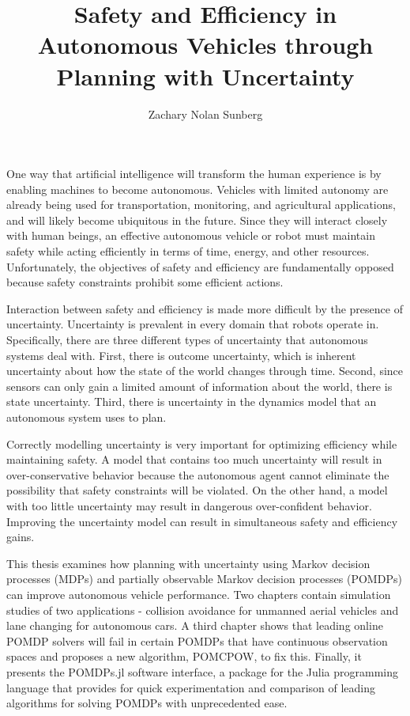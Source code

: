 \documentclass[12pt]{report}
\title{Safety and Efficiency in Autonomous Vehicles through Planning with Uncertainty}
\author{Zachary Nolan Sunberg}
\begin{document}
\beforepreface 


One way that artificial intelligence will transform the human experience is by enabling machines to become autonomous.
Vehicles with limited autonomy are already being used for transportation, monitoring, and agricultural applications, and will likely become ubiquitous in the future.
Since they will interact closely with human beings, an effective autonomous vehicle or robot must maintain safety while acting efficiently in terms of time, energy, and other resources.
Unfortunately, the objectives of safety and efficiency are fundamentally opposed because safety constraints prohibit some efficient actions.

Interaction between safety and efficiency is made more difficult by the presence of uncertainty.
Uncertainty is prevalent in every domain that robots operate in.
Specifically, there are three different types of uncertainty that autonomous systems deal with.
First, there is outcome uncertainty, which is inherent uncertainty about how the state of the world changes through time.
Second, since sensors can only gain a limited amount of information about the world, there is state uncertainty.
Third, there is uncertainty in the dynamics model that an autonomous system uses to plan.

Correctly modelling uncertainty is very important for optimizing efficiency while maintaining safety.
A model that contains too much uncertainty will result in over-conservative behavior because the autonomous agent cannot eliminate the possibility that safety constraints will be violated.
On the other hand, a model with too little uncertainty may result in dangerous over-confident behavior.
Improving the uncertainty model can result in simultaneous safety and efficiency gains.

This thesis examines how planning with uncertainty using Markov decision processes (MDPs) and partially observable Markov decision processes (POMDPs) can improve autonomous vehicle performance.
Two chapters contain simulation studies of two applications - collision avoidance for unmanned aerial vehicles and lane changing for autonomous cars.
A third chapter shows that leading online POMDP solvers will fail in certain POMDPs that have continuous observation spaces and proposes a new algorithm, POMCPOW, to fix this.
Finally, it presents the POMDPs.jl software interface, a package for the Julia programming language that provides for quick experimentation and comparison of leading algorithms for solving POMDPs with unprecedented ease.
\end{document}
